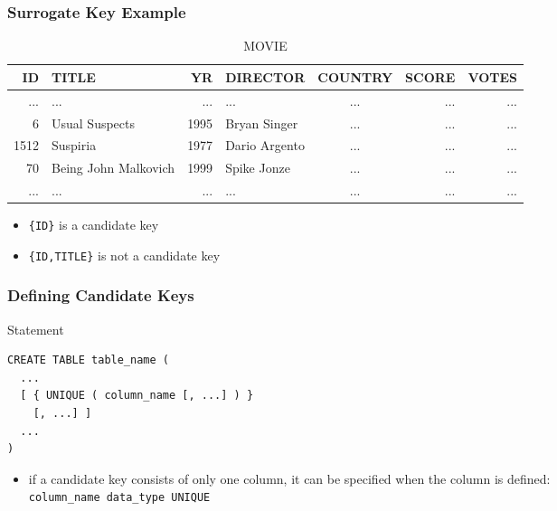 \documentclass[dvipsnames]{beamer}
\theoremstyle{plain}
\begin{document}
\begin{frame}
  \frametitle{Surrogate Key Example}

  \begin{example}
    \begin{tiny}
    \begin{table}
      \caption{MOVIE}
      \begin{tabular}{|r|l|r|l|c|r|r|}\hline
  ID & TITLE                &   YR & DIRECTOR      & COUNTRY & SCORE & VOTES\\\hline\hline
 ... & ...                  &  ... & ...           & ...     & ...   &   ...\\\hline
   6 & Usual Suspects       & 1995 & Bryan Singer  & ...     & ...   &   ...\\\hline
1512 & Suspiria             & 1977 & Dario Argento & ...     & ...   &   ...\\\hline
  70 & Being John Malkovich & 1999 & Spike Jonze   & ...     & ...   &   ...\\\hline
 ... & ...                  &  ... & ...           & ...     & ...   &   ...\\\hline
      \end{tabular}
    \end{table}
    \end{tiny}

    \pause
    \begin{itemize}
      \item \texttt{\{ID\}} is a candidate key
      \item \texttt{\{ID,TITLE\}} is not a candidate key
    \end{itemize}
  \end{example}
\end{frame}

\begin{frame}[fragile]
  \frametitle{Defining Candidate Keys}

  \begin{block}{Statement}
    \begin{lstlisting}
CREATE TABLE table_name (
  ...
  [ { UNIQUE ( column_name [, ...] ) }
    [, ...] ]
  ...
)
    \end{lstlisting}
  \end{block}

  \begin{itemize}
    \item if a candidate key consists of only one column, it can be specified
      when the column is defined:\\
      \lstinline!column_name data_type UNIQUE!
  \end{itemize}
\end{frame}
\end{document}
